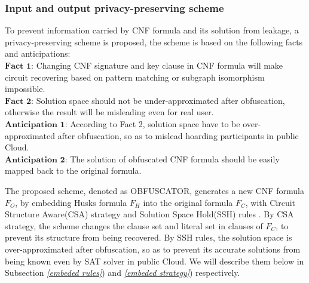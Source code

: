 \documentclass[conference]{IEEEtran}
\begin{document}
\subsubsection{Input and output privacy-preserving scheme}
To prevent information carried by CNF formula and its solution from leakage, a privacy-preserving scheme is proposed,
the scheme is based on the following facts and anticipations:
\\$\textbf{Fact 1:}$ Changing CNF signature and key clause in CNF formula will make circuit recovering
based on pattern matching or subgraph isomorphism impossible.
\\$\textbf{Fact 2:}$ Solution space should not be under-approximated after obfuscation, otherwise the result will be misleading even for real user.
\\$\textbf{Anticipation 1:}$ According to Fact 2, solution space have to be over-approximated  after obfuscation, so as to mislead hoarding participants in public Cloud.
\\$\textbf{Anticipation 2:}$ The solution of obfuscated CNF formula should be easily mapped back to the original formula.

The proposed scheme, denoted as OBFUSCATOR, generates a new CNF formula $F_O$, 
by embedding Husks formula $F_H$ into the original formula $F_C$, 
with Circuit Structure Aware(CSA) strategy and Solution Space Hold(SSH) rules .
By CSA strategy, 
the scheme changes the clause set and literal set in clauses of $F_C$, 
to prevent its structure from being recovered.
By SSH rules, 
the solution space is over-approximated after obfuscation, 
so as to prevent its accurate solutions from being known even by SAT solver in public Cloud.
We will describe them below in Subsection \textit{\ref{embeded rules}}) and \textit{\ref{embeded strategy}}) respectively. 
\end{document}
